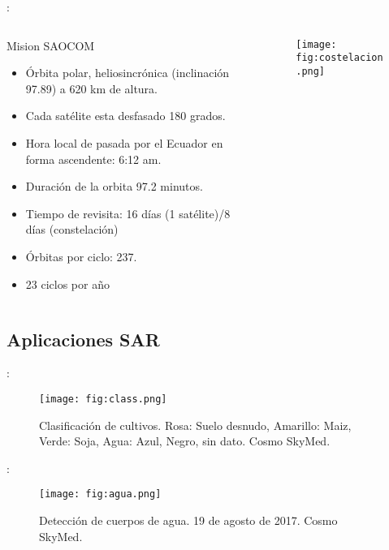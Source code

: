 \begin{frame}{\secname : \subsecname}
  \begin{columns}
    \begin{column}{0.6\textwidth}
     \begin{block}{Mision SAOCOM}
\begin{itemize}
  \item Órbita polar, heliosincrónica (inclinación 97.89) a 620 km de altura.
  \item Cada satélite esta desfasado 180 grados.
  \item Hora local de pasada por el Ecuador en forma ascendente: 6:12 am.
  \item Duración de la orbita 97.2 minutos.
  \item Tiempo de revisita: 16 días (1 satélite)/8 días (constelación)
  \item Órbitas por ciclo: 237.
  \item 23 ciclos por año
\end{itemize}
     \end{block}
    \end{column}
    \begin{column}{0.4\textwidth}  %
      \begin{figure}
        \centering
        \texttt{[image: fig:costelacion.png]}
        \caption*{}
        \label{}
      \end{figure}
    \end{column}
    \end{columns}

\end{frame}

\subsection{Aplicaciones SAR}

\begin{frame}{\secname : \subsecname}
  \begin{figure}
    \centering
    \texttt{[image: fig:class.png]}
    \caption{Clasificación de cultivos. Rosa: Suelo desnudo, Amarillo: Maiz, Verde: Soja, Agua: Azul, Negro, sin dato. Cosmo SkyMed.}
    \label{}
  \end{figure}
\end{frame}

\begin{frame}{\secname : \subsecname}
  \begin{figure}
    \centering
    \texttt{[image: fig:agua.png]}
    \caption{Detección de cuerpos de agua. 19 de agosto de 2017. Cosmo SkyMed.}
    \label{}
  \end{figure}
\end{frame}


